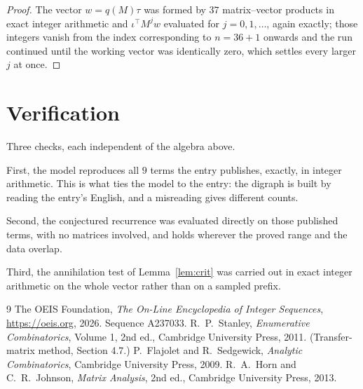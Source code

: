 \documentclass[11pt,a4paper]{article}
\theoremstyle{plain}
\theoremstyle{definition}
\begin{document}
\begin{proof}
The vector $w=q(M)\tau$ was formed by $37$ matrix--vector products in exact integer
arithmetic and $\iota^{\!\top}M^{j}w$ evaluated for $j=0,1,\dots$, again exactly; those
integers vanish from the index corresponding to $n=36+1$ onwards and the run continued
until the working vector was identically zero, which settles every larger $j$ at once.
\end{proof}

\section{Verification}

Three checks, each independent of the algebra above.

First, the model reproduces all $9$ terms the entry publishes, exactly, in integer
arithmetic. This is what ties the model to the entry: the digraph is built by reading the
entry's English, and a misreading gives different counts.

Second, the conjectured recurrence was evaluated directly on those published terms, with no
matrices involved, and holds wherever the proved range and the data overlap.

Third, the annihilation test of Lemma~\ref{lem:crit} was carried out in exact integer
arithmetic on the whole vector rather than on a sampled prefix.

\begin{thebibliography}{9}
 The OEIS Foundation, \emph{The On-Line Encyclopedia of Integer
Sequences}, \url{https://oeis.org}, 2026. Sequence A237033.
 R.~P.~Stanley, \emph{Enumerative Combinatorics}, Volume 1, 2nd ed.,
Cambridge University Press, 2011. (Transfer-matrix method, Section 4.7.)
 P.~Flajolet and R.~Sedgewick, \emph{Analytic Combinatorics}, Cambridge
University Press, 2009.
 R.~A.~Horn and C.~R.~Johnson, \emph{Matrix Analysis}, 2nd ed., Cambridge
University Press, 2013.
\end{thebibliography}
\end{document}

